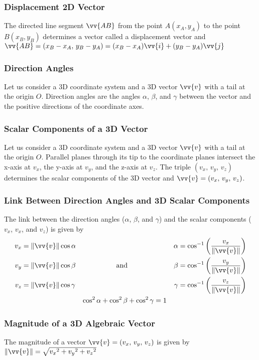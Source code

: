 \documentclass{article}
\newcommand{\mv}[1]{
	\lVert\vv{#1}\rVert
}
\begin{document}
	\subsubsection{Displacement 2D Vector}
	The directed line segment $\vv{AB}$ from the point $A(x_A, y_A)$ to the point $B(x_B, y_B)$ determines a vector called a displacement vector and $\vv{AB}=(x_B-x_A,\,y_B-y_A)=(x_B-x_A)\vv{i}+(y_B-y_A)\vv{j}$
	\subsubsection{Direction Angles}
	Let us consider a 3D coordinate system and a 3D vector $\vv{v}$ with a tail at the origin $O$. Direction angles are the angles $\alpha$, $\beta$, and $\gamma$ between the vector and the positive directions of the coordinate axes. %
	\subsubsection{Scalar Components of a 3D Vector}
	Let us consider a 3D coordinate system and a 3D vector $\vv{v}$ with a tail at the origin $O$. Parallel planes through its tip to the coordinate planes intersect the x-axis at $v_x$, the y-axis at $v_y$, and the z-axis at $v_z$. The triple $(v_x,\,v_y,\,v_z)$ determines the scalar components of the 3D vector and $\vv{v}=(v_x,\,v_y,\,v_z)$. %
	\subsubsection{Link Between Direction Angles and 3D Scalar Components}
	The link between the direction angles ($\alpha$, $\beta$, and $\gamma$) and the scalar components ($v_x$, $v_x$, and $v_z$) is given by
	\begin{align*}
		v_x&=\mv{v}\cos\alpha&&&\alpha&=\cos^{-1}\left(\frac{v_x}{\mv{v}}\right)\\
		v_y&=\mv{v}\cos\beta&\text{and}&&\beta&=\cos^{-1}\left(\frac{v_y}{\mv{v}}\right)\\
		v_z&=\mv{v}\cos\gamma&&&\gamma&=\cos^{-1}\left(\frac{v_z}{\mv{v}}\right)\\
		&&\cos^2\alpha+\cos^2\beta&+\cos^2\gamma=1
	\end{align*}
	\subsubsection{Magnitude of a 3D Algebraic Vector}
	The magnitude of a vector $\vv{v}=(v_x,\,v_y,\,v_z)$ is given by $\mv{v}=\sqrt{{v_x}^2+{v_y}^2+{v_z}^2}$
\end{document}
